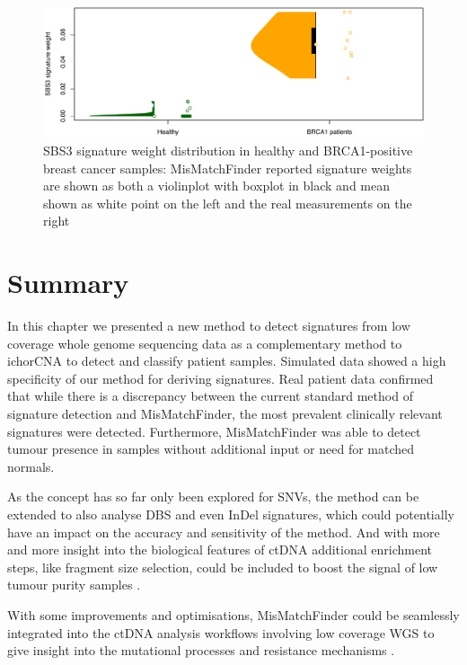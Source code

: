 \begin{figure}[ht]
\centering
\includegraphics[width=.99\linewidth]{Figures/MisMatchFinder/brca1_sbs3.pdf}
\caption[SBS3 signature weight distribution in healthy and BRCA1-positive breast cancer samples]{SBS3 signature weight distribution in healthy and BRCA1-positive breast cancer samples: MisMatchFinder reported signature weights are shown as both a violinplot with boxplot in black and mean shown as white point on the left and the real measurements on the right}\label{fig:mmf-SBS3brca1}
\end{figure}

\section{Summary}
In this chapter we presented a new method to detect signatures from low coverage whole genome sequencing data as a complementary method to ichorCNA to detect and classify patient samples. Simulated data showed a high specificity of our method for deriving signatures. Real patient data confirmed that while there is a discrepancy between the current standard method of signature detection and MisMatchFinder, the most prevalent clinically relevant signatures were detected. Furthermore, MisMatchFinder was able to detect tumour presence in samples without additional input or need for matched normals.

As the concept has so far only been explored for SNVs, the method can be extended to also analyse DBS and even InDel signatures, which could potentially have an impact on the accuracy and sensitivity of the method.
And with more and more insight into the biological features of ctDNA additional enrichment steps, like fragment size selection, could be included to boost the signal of low tumour purity samples \cite{Mouliere2018,Markus2022}.

With some improvements and optimisations, MisMatchFinder could be seamlessly integrated into the ctDNA analysis workflows involving low coverage WGS to give insight into the mutational processes and resistance mechanisms \cite{Homburger2019,Chen2021}.
